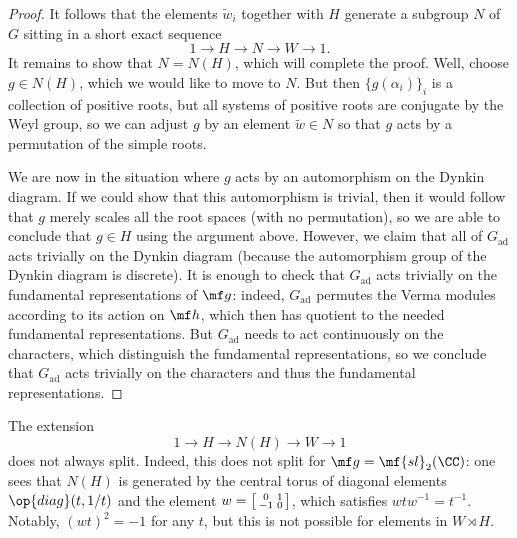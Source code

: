 \documentclass[../notes.tex]{subfiles}
\begin{document}
\begin{proof}
	It follows that the elements $\widetilde w_i$ together with $H$ generate a subgroup $N$ of $G$ sitting in a short exact sequence
	\[1\to H\to N\to W\to1.\]
	It remains to show that $N=N(H)$, which will complete the proof. Well, choose $g\in N(H)$, which we would like to move to $N$. But then $\{g(\alpha_i)\}_i$ is a collection of positive roots, but all systems of positive roots are conjugate by the Weyl group, so we can adjust $g$ by an element $\widetilde w\in N$ so that $g$ acts by a permutation of the simple roots.
	
	We are now in the situation where $g$ acts by an automorphism on the Dynkin diagram. If we could show that this automorphism is trivial, then it would follow that $g$ merely scales all the root spaces (with no permutation), so we are able to conclude that $g\in H$ using the argument above. However, we claim that all of $G_{\mathrm{ad}}$ acts trivially on the Dynkin diagram (because the automorphism group of the Dynkin diagram is discrete). It is enough to check that $G_{\mathrm{ad}}$ acts trivially on the fundamental representations of $\mf g$: indeed, $G_{\mathrm{ad}}$ permutes the Verma modules according to its action on $\mf h$, which then has quotient to the needed fundamental representations. But $G_{\mathrm{ad}}$ needs to act continuously on the characters, which distinguish the fundamental representations, so we conclude that $G_{\mathrm{ad}}$ acts trivially on the characters and thus the fundamental representations.
\end{proof}
\begin{remark}
	The extension
	\[1\to H\to N(H)\to W\to1\]
	does not always split. Indeed, this does not split for $\mf g=\mf{sl}_2(\CC)$: one sees that $N(H)$ is generated by the central torus of diagonal elements $\op{diag}(t,1/t)$ and the element $w=\begin{bsmallmatrix}
		0 & 1 \\ -1 & 0
	\end{bsmallmatrix}$, which satisfies $wtw^{-1}=t^{-1}$. Notably, $(wt)^2=-1$ for any $t$, but this is not possible for elements in $W\rtimes H$.
\end{remark}
\end{document}
